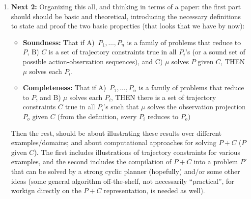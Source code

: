 \documentclass{article}
\begin{document}
\begin{enumerate}
   \item \textbf{Next 2:} Organizing this all, and thinking in terms of a paper: the first part should should be basic and theoretical, introducing the necessary definitions
       to state and proof the two basic properties (that looks that we have by now):
     \begin{itemize}
       \item \textbf{Soundness:} That if A)~$P_1, \ldots, P_n$ is a family of problems that reduce to $P$, B) $C$ is a set of trajectory constraints true in all $P_i$'s
       (or a sound set of possible action-observation sequences), and C) $\mu$ solves $P$ given $C$, THEN $\mu$ solves each $P_i$.
       \item \textbf{Completeness:} That if A)~$P_1, \ldots, P_n$ is a family of problems that reduce to $P$, and B) $\mu$ solves each $P_i$, THEN  there is a set of
         trajectory constraints $C$ true in all $P_i$'s  such that $\mu$ solves the observation projection $P_o$ given $C$ (from the definition, every $P_i$ reduces to $P_o$)
     \end{itemize}
     Then the rest,  should be about  illustrating  these results over different examples/domains; and about computational approaches for solving $P+C$ ($P$ given $C$). The first includes
     illustrations of trajectory constraints for various examples, and the second includes the compilation of $P+C$ into a problem $P'$ that can be solved by a strong cyclic planner
     (hopefully) and/or some other ideas (some general algorithm off-the-shelf, not necessarily ``practical'', for workign directly on the $P+C$ representation, is needed as well).
    

      
\end{enumerate}
\end{document}
